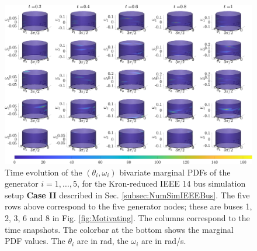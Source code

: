 \documentclass[10pt,twocolumn]{IEEEtran}
\begin{document}
\begin{figure}[t]
\centering
\includegraphics[width=0.9\linewidth]{IEEE14marginalsCase1.png}
\caption{\small{Time evolution of the $(\theta_{i},\omega_{i})$ bivariate marginal PDFs of the generator $i=1,\hdots,5$, for the Kron-reduced IEEE 14 bus simulation setup \textbf{Case II} described in Sec. \ref{subsec:NumSimIEEEBus}. The five rows above correspond to the five generator nodes; these are buses 1, 2, 3, 6 and 8 in Fig. \ref{fig:Motivating}. The columns correspond to the time snapshots. The colorbar at the bottom shows the marginal PDF values. The $\theta_i$ are in rad, the $\omega_i$ are in rad/s.}}
\vspace*{-0.1in}
\label{fig:IEEE14marginalsCase1}
\end{figure}
\end{document}
